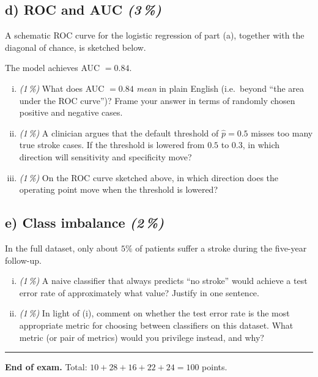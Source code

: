 \documentclass[11pt,a4paper]{article}
\newcommand{\subpoints}[1]{\textit{(#1\,\%)}}
\begin{document}
\subsection*{d) ROC and AUC \subpoints{3}}

A schematic ROC curve for the logistic regression of part (a), together with the diagonal of chance, is sketched below.

\begin{center}
\end{center}

The model achieves AUC $= 0.84$.

\begin{enumerate}[(i)]
  \item \subpoints{1} What does AUC $= 0.84$ \emph{mean} in plain English (i.e.\ beyond ``the area under the ROC curve'')? Frame your answer in terms of randomly chosen positive and negative cases.
  \item \subpoints{1} A clinician argues that the default threshold of $\hat p = 0.5$ misses too many true stroke cases. If the threshold is lowered from $0.5$ to $0.3$, in which direction will sensitivity and specificity move?
  \item \subpoints{1} On the ROC curve sketched above, in which direction does the operating point move when the threshold is lowered?
\end{enumerate}

\subsection*{e) Class imbalance \subpoints{2}}

In the full dataset, only about $5\%$ of patients suffer a stroke during the five-year follow-up.

\begin{enumerate}[(i)]
  \item \subpoints{1} A naive classifier that always predicts ``no stroke'' would achieve a test error rate of approximately what value? Justify in one sentence.
  \item \subpoints{1} In light of (i), comment on whether the test error rate is the most appropriate metric for choosing between classifiers on this dataset. What metric (or pair of metrics) would you privilege instead, and why?
\end{enumerate}

\vspace{1em}
\hrule
\vspace{0.5em}

\noindent\textbf{End of exam.} \quad Total: $10 + 28 + 16 + 22 + 24 = 100$ points.
\end{document}
